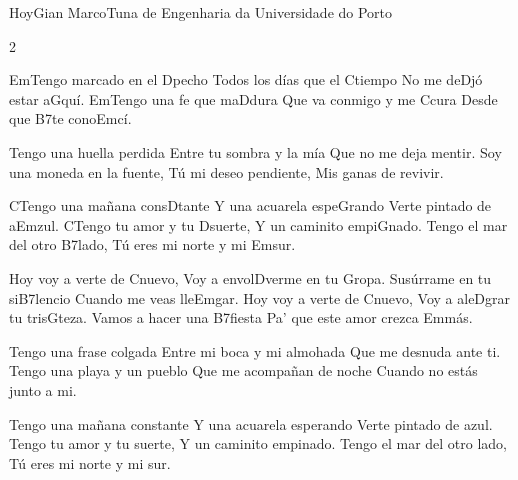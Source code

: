 \begin{musica}{Hoy}{Gian Marco}{Tuna de Engenharia da Universidade do Porto}
\begin{multicols}{2}

\ac{Em}{Ten}go marcado en el \ac{D}{pe}cho
Todos los días que el \ac{C}{tiem}po
No me de\ac{D}{jó} estar a\ac{G}{quí}.
\ac{Em}{Ten}go una fe que ma\ac{D}{du}ra
Que va conmigo y me \ac{C}{cu}ra
Desde que \ac{B7}{te} cono\ac{Em}{cí}.

Tengo una huella perdida
Entre tu sombra y la mía
Que no me deja mentir.
Soy una moneda en la fuente,
Tú mi deseo pendiente,
Mis ganas de revivir.

\ac{C}{Ten}go una mañana cons\ac{D}{tan}te
Y una acuarela espe\ac{G}{ran}do
Verte pintado de a\ac{Em}{zul}.
\ac{C}{Ten}go tu amor y tu \ac{D}{suer}te,
Y un caminito empi\ac{G}{na}do.
Tengo el mar del otro \ac{B7}{la}do,
Tú eres mi norte y mi \ac{Em}{sur}.

Hoy voy a verte de \ac{C}{nue}vo,
Voy a envol\ac{D}{ver}me en tu \ac{G}{ro}pa.
Susúrrame en tu si\ac{B7}{len}cio
Cuando me veas lle\ac{Em}{gar}.
Hoy voy a verte de \ac{C}{nue}vo,
Voy a ale\ac{D}{grar} tu tris\ac{G}{te}za.
Vamos a hacer una \ac{B7}{fies}ta
Pa' que este amor crezca \ac{Em}{más}.

Tengo una frase colgada
Entre mi boca y mi almohada
Que me desnuda ante ti.
Tengo una playa y un pueblo
Que me acompañan de noche
Cuando no estás junto a mi.

Tengo una mañana constante
Y una acuarela esperando
Verte pintado de azul.
Tengo tu amor y tu suerte,
Y un caminito empinado.
Tengo el mar del otro lado,
Tú eres mi norte y mi sur.


\end{multicols}

\end{musica}
